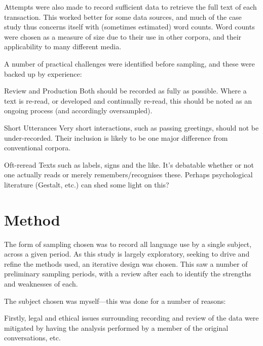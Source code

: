 Attempts were also made to record sufficient data to retrieve the full text of each transaction.  This worked better for some data sources, and much of the case study thus concerns itself with (sometimes estimated) word counts.  Word counts were chosen as a measure of size due to their use in other corpora, and their applicability to many different media.


A number of practical challenges were identified before sampling, and these were backed up by experience:
\begin{itemizeTitle}
    \item[Review and Production] Both should be recorded as fully as possible. Where a text is re-read, or developed and continually re-read, this should be noted as an ongoing process (and accordingly oversampled).
    \item[Short Utterances] Very short interactions, such as passing greetings, should not be under-recorded. Their inclusion is likely to be one major difference from conventional corpora.
    \item[Oft-reread Texts] such as labels, signs and the like. It’s debatable whether or not one actually reads or merely remembers/recognises these. Perhaps psychological literature (Gestalt, etc.) can shed some light on this?
\end{itemizeTitle}










\section{Method}
The form of sampling chosen was to record all language use by a single subject, across a given period.  As this study is largely exploratory, seeking to drive and refine the methods used, an iterative design was chosen.  This saw a number of preliminary sampling periods, with a review after each to identify the strengths and weaknesses of each.

The subject chosen was myself---this was done for a number of reasons:

Firstly, legal and ethical issues surrounding recording and review of the data were mitigated by having the analysis performed by a member of the original conversations, etc.

